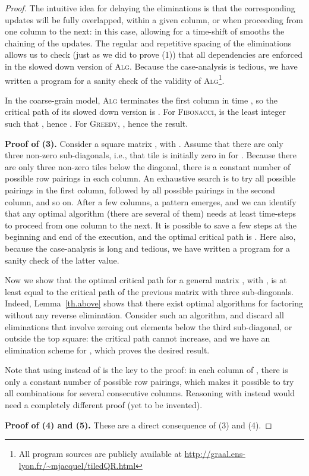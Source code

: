 \documentclass[a4paper,twopages]{article}
\newcommand{\MC}{\textsc{Fibonacci}\xspace}
\newcommand{\Greedy}{\textsc{Greedy}\xspace}
\newcommand{\Alg}{\textsc{Alg}\xspace}
\newcommand{\TiledQRURL}{\url{http://graal.ens-lyon.fr/~mjacquel/tiledQR.html}\xspace}
\begin{document}
\begin{proof}
    The intuitive idea for delaying the eliminations is that the corresponding
    updates will be fully overlapped, within a given column, or when proceeding
    from one column to the next: in this case, allowing for a time-shift of
     smooths the chaining of the updates. The regular and repetitive
    spacing of the eliminations allows us to check (just as we did to prove (1))
    that all dependencies are enforced in the slowed down version of \Alg.
    Because the case-analysis is tedious, we have written a program for a
    sanity check of the validity of \Alg\footnote{All program sources are
    publicly available at \TiledQRURL}.

    In the coarse-grain model, \Alg  terminates the first column in time ,
    so the critical path of its slowed down version is . For \MC,
     is the least integer such that , hence .  For \Greedy, , hence the result.

\textbf{Proof of (3).}
    Consider a square  matrix , with . Assume that there
    are only three non-zero sub-diagonals, i.e., that tile  is initially
    zero in  for . Because there are only three non-zero tiles below the
    diagonal, there is a constant number of possible row pairings in each
    column. An exhaustive search is to try all possible pairings in the first
    column, followed by all possible pairings in the second column, and so on.
    After a few columns, a pattern emerges, and we can identify that any
    optimal algorithm (there are several of them) needs at least 
    time-steps to proceed from one column to the next.  It is possible to save
    a few steps at the beginning and end of the execution, and the optimal
    critical path is . Here also, because the case-analysis is long
    and tedious, we have written a program for a sanity check of the latter
    value.

    Now we show that the optimal critical path for a general 
    matrix , with , is at least equal to the critical path
    of the previous  matrix  with three sub-diagonals. Indeed,
    Lemma~\ref{th.above} shows that there exist optimal algorithms for
    factoring  without any reverse elimination. Consider such an algorithm,
    and discard all eliminations that involve zeroing out elements below the
    third sub-diagonal, or outside the  top square: the critical
    path cannot increase, and we have an elimination scheme for , which
    proves the desired result.

    Note that using  instead of  is the key to the proof: in each column of
    , there is only a constant number of possible row pairings, which makes it possible to
    try all combinations for several consecutive columns. Reasoning with  instead would
    need a completely different proof (yet to be invented).

\textbf{Proof of (4) and (5).}
    These are a direct consequence of (3) and (4).
\end{proof}
\end{document}
